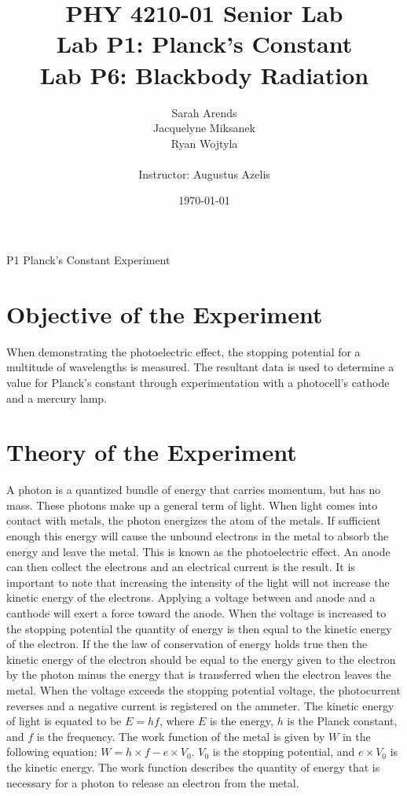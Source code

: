 \documentclass[a4paper]{article}
\title{PHY 4210-01 Senior Lab \\Lab P1: Planck's Constant\\Lab P6: Blackbody Radiation}
\author{Sarah Arends \\
        Jacquelyne Miksanek \\
        Ryan Wojtyla \\ \\
        Instructor: Augustus Azelis}
\date{\today}
\begin{document}
\maketitle

\begin{abstract}
\qq 
\end{abstract}

\newpage

\tableofcontents

\newpage

P1 Planck's Constant Experiment

\newpage

\section{Objective of the Experiment}
\qq When demonstrating the photoelectric effect, the stopping
potential for a multitude of wavelengths is measured. The resultant
data is used to determine a value for Planck's constant through
experimentation with a photocell's cathode and a mercury lamp.

\section{Theory of the Experiment}
\qq A photon is a quantized bundle of energy that carries momentum,
but has no mass. These photons make up a general term of light. When
light comes into contact with metals, the photon energizes the atom of
the metals. If sufficient enough this energy will cause the unbound
electrons in the metal to absorb the energy and leave the metal. This
is known as the photoelectric effect. An anode can then collect the
electrons and an electrical current is the result. It is important to
note that increasing the intensity of the light will not increase the
kinetic energy of the electrons. Applying a voltage between and anode
and a canthode will exert a force toward the anode. When the voltage
is increased to the stopping potential the quantity of energy is then
equal to the kinetic energy of the electron. If the the law of
conservation of energy holds true then the kinetic energy of the
electron should be equal to the energy given to the electron by the
photon minus the energy that is transferred when the electron leaves
the metal. When the voltage exceeds the stopping potential voltage,
the photocurrent reverses and a negative current is registered on the
ammeter. The kinetic energy of light is equated to be $ E = hf$, where
$E$ is the energy, $h$ is the Planck constant, and $f$ is the
frequency. The work function of the metal is given by $W$ in the
following equation: $ W = h \times f - e \times V_0$. $V_0$ is the
stopping potential, and $e \times V_0$ is the kinetic energy. The work
function describes the quantity of energy that is necessary for a
photon to release an electron from the metal.
\end{document}
